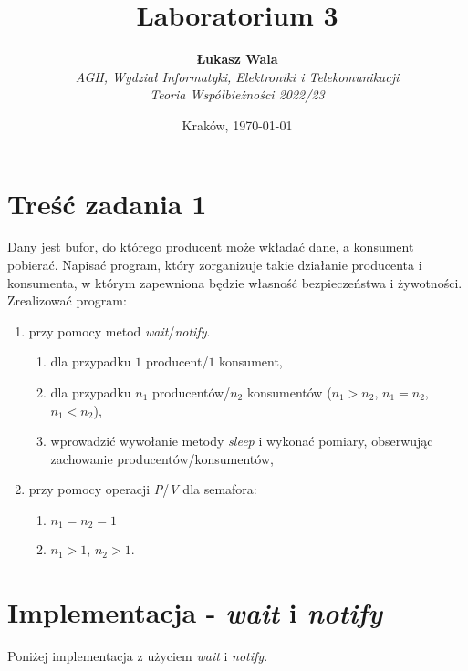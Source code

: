 \documentclass{article}
\title{Laboratorium 3}
\author{\textbf{Łukasz Wala}\\
    \textit{AGH, Wydział Informatyki, Elektroniki i Telekomunikacji} \\
    \textit{Teoria Współbieżności 2022/23}}
\date{Kraków, \today}
\begin{document}
\maketitle

\section{Treść zadania 1}
Dany jest bufor, do którego producent może wkładać dane, a konsument pobierać. Napisać program, który zorganizuje takie
działanie producenta i konsumenta, w którym zapewniona będzie własność bezpieczeństwa i żywotności.
Zrealizować program:
\begin{enumerate}
    \item
    przy pomocy metod \textit{wait}/\textit{notify}.
    \begin{enumerate}[label=(\alph*)]
        \item
        dla przypadku $1$ producent/$1$ konsument,
        \item
        dla przypadku $n_1$ producentów/$n_2$ konsumentów ($n_1>n_2$, $n_1=n_2$, $n_1<n_2$),
        \item
        wprowadzić wywołanie metody \textit{sleep} i wykonać pomiary, obserwując zachowanie producentów/konsumentów,
    \end{enumerate}

    \item
    przy pomocy operacji \textit{P}/\textit{V} dla semafora:
    \begin{enumerate}[label=(\alph*)]
        \item
        $n_1=n_2=1$
        \item
        $n_1>1$, $n_2>1$.
    \end{enumerate}
\end{enumerate}

\section{Implementacja - \textit{wait} i \textit{notify}}

Poniżej implementacja z użyciem \textit{wait} i \textit{notify}.
\end{document}
